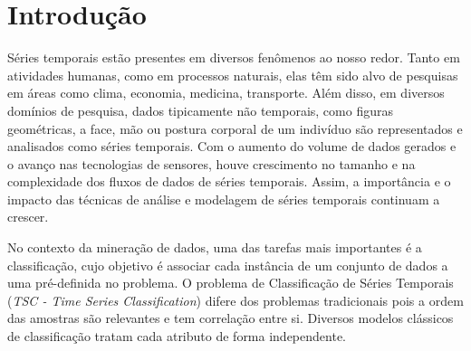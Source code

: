 
\chapter{Introdução} %


Séries temporais estão presentes em diversos fenômenos ao nosso redor. Tanto em atividades humanas, como em processos naturais, elas têm sido alvo de pesquisas em áreas como clima, economia, medicina, transporte. Além disso, em diversos domínios de pesquisa, dados tipicamente não temporais, como figuras geométricas, a face, mão ou postura corporal de um indivíduo são representados e analisados como séries temporais. Com o aumento do volume de dados gerados e o avanço nas tecnologias de sensores, houve crescimento no tamanho e na complexidade dos fluxos de dados de séries temporais. Assim, a importância e o impacto das técnicas de análise e modelagem de séries temporais continuam a crescer. 

No contexto da mineração de dados, uma das tarefas mais importantes é a classificação, cujo objetivo é associar cada instância de um conjunto de dados a uma pré-definida no problema. O problema de Classificação de Séries Temporais (\textit{TSC - Time Series Classification}) difere dos problemas tradicionais pois a ordem das amostras são relevantes e tem correlação entre si. Diversos modelos clássicos de classificação tratam cada atributo de forma independente.  

